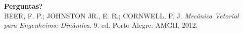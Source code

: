 \documentclass[11pt,aspectratio=169]{beamer}
\begin{document}
\begin{frame}[plain]
  \begin{center}
    {\Huge\bfseries Perguntas?}\\[0.8cm]
    {\small BEER, F. P.; JOHNSTON JR., E. R.; CORNWELL, P. J. \textit{Mecânica Vetorial para Engenheiros: Dinâmica}. 9. ed. Porto Alegre: AMGH, 2012.}
  \end{center}
\end{frame}
\end{document}

